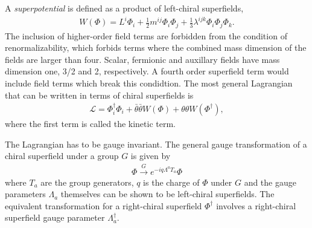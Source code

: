  A {\it superpotential} is defined as a product of left-chiral superfields,
 \begin{align}
 	W(\Phi) = L^i\Phi_i + \frac{1}{2}m^{ij}\Phi_i\Phi_j + \frac{1}{3}\lambda^{ijk}\Phi_i\Phi_j\Phi_k.
 \end{align}
The inclusion of higher-order field terms are forbidden from the condition of renormalizability, which forbids terms where the combined mass dimension of the fields are larger than four. Scalar, fermionic and auxillary fields have mass dimension one, 3/2 and 2, respectively. A fourth order superfield term would include field terms which break this condidtion. The most general Lagrangian that can be written in terms of chiral superfields is
\begin{align}
	\mathcal{L} = \Phi_i^\dag \Phi_i + \bar\theta\bar\theta W(\Phi) + \theta\theta W(\Phi^\dag),
\end{align}
where the first term is called the kinetic term. 

The Lagrangian has to be gauge invariant. The general gauge transformation of a chiral superfield under a group $G$ is given by
\begin{align}
	\Phi \overset{G}{\to} e^{-iq\Lambda^a T_a}\Phi
\end{align}
where $T_a$ are the group generators, $q$ is the charge of $\Phi$ under $G$ and the gauge parameters $\Lambda_a$ themselves can be shown to be left-chiral superfields. The equivalent transformation for a right-chiral superfield $\Phi^\dag$ involves a right-chiral superfield gauge parameter $\Lambda_a^\dag$.


